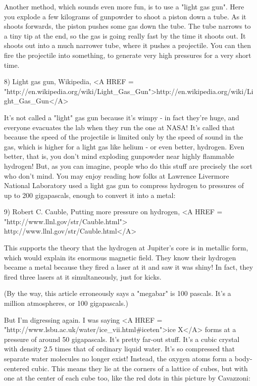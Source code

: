 Another method, which sounds even more fun, is to use a "light
gas gun".  Here you explode a few kilograms of gunpowder to shoot
a piston down a tube.  As it shoots forwards, the piston pushes some
gas down the tube.  The tube narrows to a tiny tip at the end, so the
gas is going really fast by the time it shoots out.  It shoots out
into a much narrower tube, where it pushes a projectile.  You can then
fire the projectile into something, to generate very high pressures
for a very short time.

8) Light gas gun, Wikipedia, <A HREF = "http://en.wikipedia.org/wiki/Light_Gas_Gun">http://en.wikipedia.org/wiki/Light_Gas_Gun</A>

It's not called a "light" gas gun because it's wimpy - in
fact they're huge, and everyone evacuates the lab when they run the
one at NASA!  It's called that because the speed of the projectile is
limited only by the speed of sound in the gas, which is higher for a
light gas like helium - or even better, hydrogen.  Even better, that
is, you don't mind exploding gunpowder near highly flammable hydrogen!
But, as you can imagine, people who do this stuff are precisely the
sort who don't mind.  You may enjoy reading how folks at Lawrence
Livermore National Laboratory used a light gas gun to compress
hydrogen to pressures of up to 200 gigapascals, enough to convert it
into a metal:

9) Robert C. Cauble, Putting more pressure on hydrogen,
<A HREF = "http://www.llnl.gov/str/Cauble.html">
http://www.llnl.gov/str/Cauble.html</A>

This supports the theory that the hydrogen at Jupiter's core is in 
metallic form, which would explain its enormous magnetic field.
They know their hydrogen became a metal because they fired a laser 
at it and saw it was shiny!   In fact, they fired three lasers at 
it simultaneously, just for kicks.

(By the way, this article erroneously says a "megabar" is
100 pascals.  It's a million atmospheres, or 100 gigapascals.)

But I'm digressing again.  I was saying 
<A HREF = "http://www.lsbu.ac.uk/water/ice_vii.html#iceten">ice X</A>
forms at a pressure
of around 50 gigapascals.  It's pretty far-out stuff.  It's a cubic 
crystal with density 2.5 times that of ordinary liquid water.  
It's so compressed that separate water molecules no longer exist!   
Instead, the oxygen atoms form a body-centered cubic.  This means 
they lie at the corners of a lattice of cubes, but with one at the 
center of each cube too, like the red dots in this picture by
Cavazzoni:

